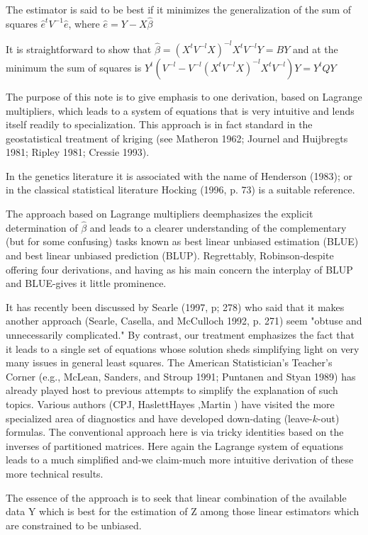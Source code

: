\documentclass[Main.tex]{subfiles}
\begin{document}
	The estimator is said to be best if it minimizes the generalization of the sum of squares $\hat{e}^{t}V^{-1}\hat{e}$, where $\hat{e} = Y- X\hat{\beta}$
	
	It is straightforward to show that $\hat{\beta} = (X^tV^{-l}X)^{-l}X^tV^{-l}Y = BY$ and at the minimum the sum of squares is $Y^{t} (V^{-l}  - V^{-l}(X^tV^{-l}X)^{-l}X^tV^{-l})Y = Y^{t}QY$
	
\bigskip	
The purpose of this note is to give emphasis to one derivation, based on Lagrange multipliers, which leads to a system of equations that is very intuitive and lends itself readily to specialization. This approach is in fact standard in the geostatistical treatment of kriging (see Matheron 1962; Journel and Huijbregts 1981; Ripley 1981; Cressie 1993). 
		
		In the genetics literature it is associated with the name of Henderson (1983); or in the classical statistical literature Hocking (1996, p. 73) is a suitable reference.
	
The approach based on Lagrange multipliers deemphasizes the explicit determination of $\hat{\beta}$ and leads to a clearer understanding of the complementary (but for some confusing) tasks known as best linear unbiased estimation (BLUE) and best linear unbiased prediction (BLUP). Regrettably, Robinson-despite offering four derivations, and having as his main concern the interplay of BLUP and BLUE-gives it little prominence.
\bigskip	
	
	It has recently been discussed by Searle (1997, p; 278) who said that it makes another approach (Searle, Casella, and McCulloch 1992, p. 271) seem "obtuse and unnecessarily complicated." By contrast, our treatment emphasizes the fact that it leads to a single set of equations whose solution sheds simplifying light on very many issues in general least squares. The American Statistician's Teacher's Corner (e.g., McLean, Sanders, and Stroup 1991; Puntanen and Styan 1989) has already played host to previous attempts to simplify the explanation of such topics. Various authors (CPJ, HaslettHayes ,Martin ) have visited the more specialized area of diagnostics and have developed down-dating (leave-$k$-out) formulas. The conventional approach here is via tricky identities based on the inverses of partitioned matrices. Here again the Lagrange system of equations leads to a much simplified and-we claim-much more intuitive derivation of these more technical results.
	
	
\bigskip
		The essence of the approach is to seek that linear combination of the available data Y which is best for the 
		estimation of Z among those linear estimators which are constrained to be unbiased. 
		
\end{document}
